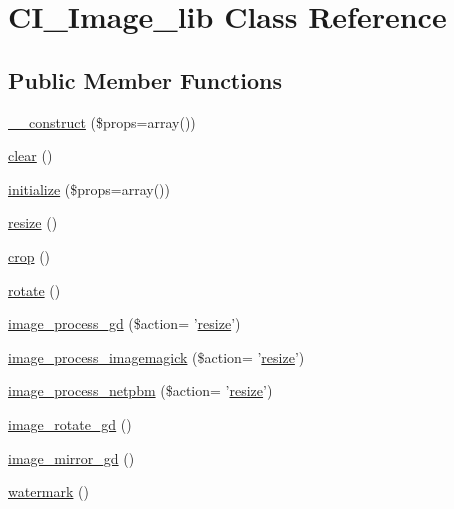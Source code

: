 \hypertarget{class_c_i___image__lib}{\section{C\-I\-\_\-\-Image\-\_\-lib Class Reference}
\label{class_c_i___image__lib}
}
\subsection*{Public Member Functions}
\begin{DoxyCompactItemize}
\item 
\hyperlink{class_c_i___image__lib_a563262d396a1cef6153c9998d77bb548}{\-\_\-\-\_\-construct} (\$props=array())
\item 
\hyperlink{class_c_i___image__lib_aa821bec12eaa7e0f649397c9675ff505}{clear} ()
\item 
\hyperlink{class_c_i___image__lib_a0bccf32e3d2d283de0521949330cb969}{initialize} (\$props=array())
\item 
\hyperlink{class_c_i___image__lib_a94e38a7d478ce07200a52c51497e598e}{resize} ()
\item 
\hyperlink{class_c_i___image__lib_a77248c0134d1b117eb36774ecee6e04c}{crop} ()
\item 
\hyperlink{class_c_i___image__lib_a74e94d71195d9cbb9c9e3bca3353d912}{rotate} ()
\item 
\hyperlink{class_c_i___image__lib_a3744cd1438c26d74169260e3580c18c5}{image\-\_\-process\-\_\-gd} (\$action= '\hyperlink{class_c_i___image__lib_a94e38a7d478ce07200a52c51497e598e}{resize}')
\item 
\hyperlink{class_c_i___image__lib_ab92e23a2b66ec7e2a3ade452214ac3fd}{image\-\_\-process\-\_\-imagemagick} (\$action= '\hyperlink{class_c_i___image__lib_a94e38a7d478ce07200a52c51497e598e}{resize}')
\item 
\hyperlink{class_c_i___image__lib_a715b6f648450b393c843af9a8756f6d8}{image\-\_\-process\-\_\-netpbm} (\$action= '\hyperlink{class_c_i___image__lib_a94e38a7d478ce07200a52c51497e598e}{resize}')
\item 
\hyperlink{class_c_i___image__lib_ae0d52ef7503342a0a1c56c99da140446}{image\-\_\-rotate\-\_\-gd} ()
\item 
\hyperlink{class_c_i___image__lib_a3f6d47ec077726da699890d4644797ad}{image\-\_\-mirror\-\_\-gd} ()
\item 
\hyperlink{class_c_i___image__lib_a4732a76680e7c0b28f98f6634b567cc9}{watermark} ()
\item 

\end{DoxyCompactItemize}
